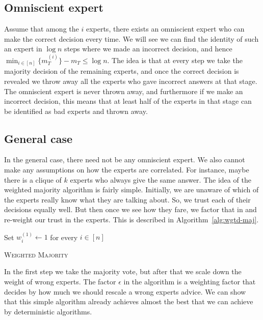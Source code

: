 \subsection{Omniscient expert}

Assume that among the $i$ experts, there exists an omniscient expert who can make the correct decision every time. We will see we can find the identity of such an expert in $\log n$ steps where we made an incorrect decision, and hence $\min_{i\in [n]} \{ m^{(i)}_T \} - m_T \leq \log n$. The idea is that at every step we take the majority decision of the remaining experts, and once the correct decision is revealed we throw away all the experts who gave incorrect answers at that stage. The omniscient expert is never thrown away, and furthermore if we make an incorrect decision, this means that at least half of the experts in that stage can be identified as bad experts and thrown away.

\subsection{General case}

In the general case, there need not be any omniscient expert. We also cannot make any assumptions on how the experts are correlated. For instance, maybe there is a clique of $k$ experts who always give the same answer. The idea of the weighted majority algorithm is fairly simple. Initially, we are unaware of which of the experts really know what they are talking about. So, we trust each of their decisions equally well. But then once we see how they fare, we factor that in and re-weight our trust in the experts. This is described in Algorithm~\ref{alg:wgtd-maj}.

\begin{algorithm}%
	Set $w_i^{(1)} \gets 1$ for every $i \in [n]$
	
	\caption{\textsc{Weighted Majority}}
	\label{alg:wgtd-maj}
\end{algorithm}

In the first step we take the majority vote, but after that we scale down the weight of wrong experts. The factor $\epsilon$ in the algorithm is a weighting factor that decides by how much we should rescale a wrong experts advice. We can show that this simple algorithm already achieves almost the best that we can achieve by deterministic algorithms.

